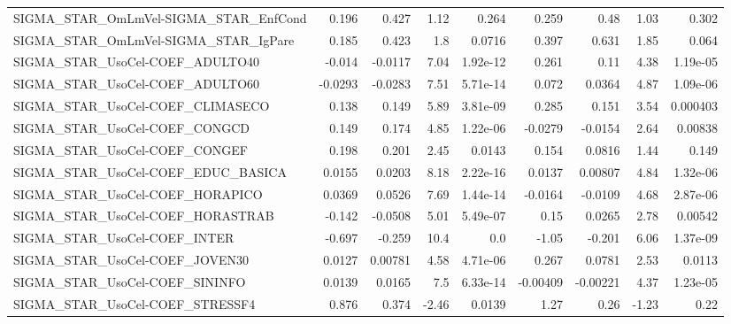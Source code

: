 \begin{tabular}{lrrrrrrrr}
SIGMA\_STAR\_OmLmVel-SIGMA\_STAR\_EnfCond &       0.196 &        0.427 &    1.12 &    0.264 &      0.259 &        0.48 &         1.03 &         0.302 \\
SIGMA\_STAR\_OmLmVel-SIGMA\_STAR\_IgPare  &       0.185 &        0.423 &     1.8 &   0.0716 &      0.397 &       0.631 &         1.85 &         0.064 \\
SIGMA\_STAR\_UsoCel-COEF\_ADULTO40       &      -0.014 &      -0.0117 &    7.04 & 1.92e-12 &      0.261 &        0.11 &         4.38 &      1.19e-05 \\
SIGMA\_STAR\_UsoCel-COEF\_ADULTO60       &     -0.0293 &      -0.0283 &    7.51 & 5.71e-14 &      0.072 &      0.0364 &         4.87 &      1.09e-06 \\
SIGMA\_STAR\_UsoCel-COEF\_CLIMASECO      &       0.138 &        0.149 &    5.89 & 3.81e-09 &      0.285 &       0.151 &         3.54 &      0.000403 \\
SIGMA\_STAR\_UsoCel-COEF\_CONGCD         &       0.149 &        0.174 &    4.85 & 1.22e-06 &    -0.0279 &     -0.0154 &         2.64 &       0.00838 \\
SIGMA\_STAR\_UsoCel-COEF\_CONGEF         &       0.198 &        0.201 &    2.45 &   0.0143 &      0.154 &      0.0816 &         1.44 &         0.149 \\
SIGMA\_STAR\_UsoCel-COEF\_EDUC\_BASICA    &      0.0155 &       0.0203 &    8.18 & 2.22e-16 &     0.0137 &     0.00807 &         4.84 &      1.32e-06 \\
SIGMA\_STAR\_UsoCel-COEF\_HORAPICO       &      0.0369 &       0.0526 &    7.69 & 1.44e-14 &    -0.0164 &     -0.0109 &         4.68 &      2.87e-06 \\
SIGMA\_STAR\_UsoCel-COEF\_HORASTRAB      &      -0.142 &      -0.0508 &    5.01 & 5.49e-07 &       0.15 &      0.0265 &         2.78 &       0.00542 \\
SIGMA\_STAR\_UsoCel-COEF\_INTER          &      -0.697 &       -0.259 &    10.4 &      0.0 &      -1.05 &      -0.201 &         6.06 &      1.37e-09 \\
SIGMA\_STAR\_UsoCel-COEF\_JOVEN30        &      0.0127 &      0.00781 &    4.58 & 4.71e-06 &      0.267 &      0.0781 &         2.53 &        0.0113 \\
SIGMA\_STAR\_UsoCel-COEF\_SININFO        &      0.0139 &       0.0165 &     7.5 & 6.33e-14 &   -0.00409 &    -0.00221 &         4.37 &      1.23e-05 \\
SIGMA\_STAR\_UsoCel-COEF\_STRESSF4       &       0.876 &        0.374 &   -2.46 &   0.0139 &       1.27 &        0.26 &        -1.23 &          0.22 \\

\end{tabular}
